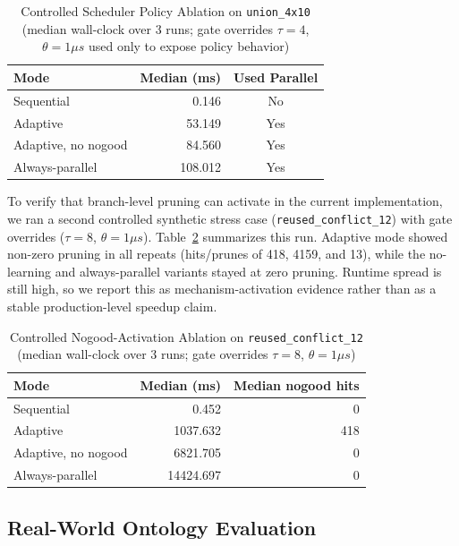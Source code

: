 \documentclass[preprint,12pt,times]{elsarticle}
\begin{document}
\begin{table}[htbp]
\centering
\caption{Controlled Scheduler Policy Ablation on \texttt{union\_4x10} (median wall-clock over 3 runs; gate overrides $\tau=4$, $\theta=1\mu s$ used only to expose policy behavior)}
\label{tab:scheduler-ablation}
\begin{tabular}{l|r|c}
\toprule
\textbf{Mode} & \textbf{Median (ms)} & \textbf{Used Parallel} \\
\midrule
Sequential & 0.146 & No \\
Adaptive & 53.149 & Yes \\
Adaptive, no nogood & 84.560 & Yes \\
Always-parallel & 108.012 & Yes \\
\bottomrule
\end{tabular}
\end{table}

To verify that branch-level pruning can activate in the current implementation, we ran a second controlled synthetic stress case (\texttt{reused\_conflict\_12}) with gate overrides ($\tau=8$, $\theta=1\mu s$). Table~\ref{tab:nogood-activation} summarizes this run. Adaptive mode showed non-zero pruning in all repeats (hits/prunes of 418, 4159, and 13), while the no-learning and always-parallel variants stayed at zero pruning. Runtime spread is still high, so we report this as mechanism-activation evidence rather than as a stable production-level speedup claim.

\begin{table}[htbp]
\centering
\caption{Controlled Nogood-Activation Ablation on \texttt{reused\_conflict\_12} (median wall-clock over 3 runs; gate overrides $\tau=8$, $\theta=1\mu s$)}
\label{tab:nogood-activation}
\begin{tabular}{l|r|r}
\toprule
\textbf{Mode} & \textbf{Median (ms)} & \textbf{Median nogood hits} \\
\midrule
Sequential & 0.452 & 0 \\
Adaptive & 1037.632 & 418 \\
Adaptive, no nogood & 6821.705 & 0 \\
Always-parallel & 14424.697 & 0 \\
\bottomrule
\end{tabular}
\end{table}

\subsection{Real-World Ontology Evaluation}
\label{sec:realworld}
\end{document}
